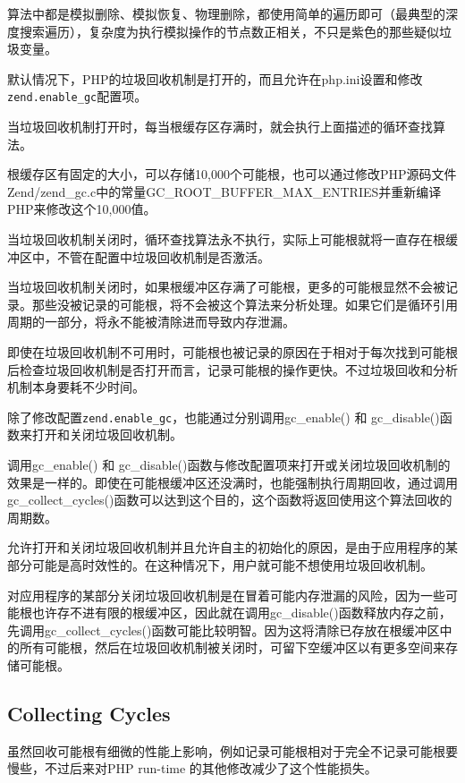 算法中都是模拟删除、模拟恢复、物理删除，都使用简单的遍历即可（最典型的深度搜索遍历），复杂度为执行模拟操作的节点数正相关，不只是紫色的那些疑似垃圾变量。

默认情况下，PHP的垃圾回收机制是打开的，而且允许在php.ini设置和修改\texttt{zend.enable\_gc}配置项。

当垃圾回收机制打开时，每当根缓存区存满时，就会执行上面描述的循环查找算法。

根缓存区有固定的大小，可以存储10,000个可能根，也可以通过修改PHP源码文件Zend/zend\_gc.c中的常量GC\_ROOT\_BUFFER\_MAX\_ENTRIES并重新编译PHP来修改这个10,000值。

当垃圾回收机制关闭时，循环查找算法永不执行，实际上可能根就将一直存在根缓冲区中，不管在配置中垃圾回收机制是否激活。

当垃圾回收机制关闭时，如果根缓冲区存满了可能根，更多的可能根显然不会被记录。那些没被记录的可能根，将不会被这个算法来分析处理。如果它们是循环引用周期的一部分，将永不能被清除进而导致内存泄漏。

即使在垃圾回收机制不可用时，可能根也被记录的原因在于相对于每次找到可能根后检查垃圾回收机制是否打开而言，记录可能根的操作更快。不过垃圾回收和分析机制本身要耗不少时间。

除了修改配置\texttt{zend.enable\_gc}，也能通过分别调用gc\_enable() 和 gc\_disable()函数来打开和关闭垃圾回收机制。

调用gc\_enable() 和 gc\_disable()函数与修改配置项来打开或关闭垃圾回收机制的效果是一样的。即使在可能根缓冲区还没满时，也能强制执行周期回收，通过调用gc\_collect\_cycles()函数可以达到这个目的，这个函数将返回使用这个算法回收的周期数。

允许打开和关闭垃圾回收机制并且允许自主的初始化的原因，是由于应用程序的某部分可能是高时效性的。在这种情况下，用户就可能不想使用垃圾回收机制。

对应用程序的某部分关闭垃圾回收机制是在冒着可能内存泄漏的风险，因为一些可能根也许存不进有限的根缓冲区，因此就在调用gc\_disable()函数释放内存之前，先调用gc\_collect\_cycles()函数可能比较明智。因为这将清除已存放在根缓冲区中的所有可能根，然后在垃圾回收机制被关闭时，可留下空缓冲区以有更多空间来存储可能根。



\subsection{Collecting Cycles}


虽然回收可能根有细微的性能上影响，例如记录可能根相对于完全不记录可能根要慢些，不过后来对PHP run-time 的其他修改减少了这个性能损失。


